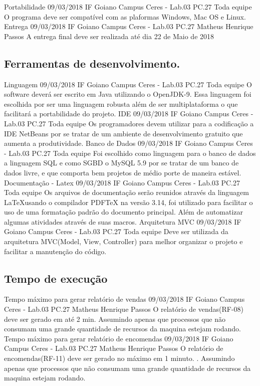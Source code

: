     {Portabilidade}
    {09/03/2018}
    {IF Goiano Campus Ceres - Lab.03 PC.27}
    {Toda equipe}
    {O programa deve ser compatível com as plaformas Windows, Mac OS e Linux.}
    {Entrega}
    {09/03/2018}
    {IF Goiano Campus Ceres - Lab.03 PC.27}
    {Matheus Henrique Passos}
    {A entrega final deve ser realizada até dia 22 de Maio de 2018}
\subsection{Ferramentas de desenvolvimento.}
    {Linguagem}
    {09/03/2018}
    {IF Goiano Campus Ceres - Lab.03 PC.27}
    {Toda equipe}
    {O software deverá ser escrito em Java utilizando o OpenJDK-9. Essa linguagem foi escolhida por ser uma linguagem robusta além de ser multiplataforma o que facilitará a portabilidade do projeto.}
    {IDE}
    {09/03/2018}
    {IF Goiano Campus Ceres - Lab.03 PC.27}
    {Toda equipe}
    {Os programadores devem utilizar para a codificação a IDE NetBeans por se tratar de um ambiente de desenvolvimento gratuito que aumenta a produtividade.}
    {Banco de Dados}
    {09/03/2018}
    {IF Goiano Campus Ceres - Lab.03 PC.27}
    {Toda equipe}
    {Foi escolhido como linguagem para o banco de dados a linguagem SQL e como SGBD o MySQL 5.9 por se tratar de um banco de dados livre, e que comporta bem projetos de médio porte de maneira estável.}
    {Documentação - Latex}
    {09/03/2018}
    {IF Goiano Campus Ceres - Lab.03 PC.27}
    {Toda equipe}
    {Os arquivos de documentação serão reunidos através da linguagem \LaTeX usando o compilador PDFTeX na versão 3.14, foi utilizado para facilitar o uso de uma formatação padrão do documento principal. Além de automatizar algumas atividades através de suas macros.}
    {Arquitetura MVC}
    {09/03/2018}
    {IF Goiano Campus Ceres - Lab.03 PC.27}
    {Toda equipe}
    {Deve ser utilizada da arquitetura MVC(Model, View, Controller) para melhor organizar o projeto e facilitar a manutenção do código.}
    
\subsection{Tempo de execução}
    {Tempo máximo para gerar relatório de vendas}
    {09/03/2018}
    {IF Goiano Campus Ceres - Lab.03 PC.27}
    {Matheus Henrique Passos}
    {O relatório de vendas(RF-08) deve ser gerado em até 2 min. Assumindo apenas que processos que não consumam uma grande quantidade de recursos da maquina estejam rodando.}
    {Tempo máximo para gerar relatório de encomendas}
    {09/03/2018}
    {IF Goiano Campus Ceres - Lab.03 PC.27}
    {Matheus Henrique Passos}
    {O relatório de encomendas(RF-11) deve ser gerado no máximo em 1 minuto. . Assumindo apenas que processos que não consumam uma grande quantidade de recursos da maquina estejam rodando.}
